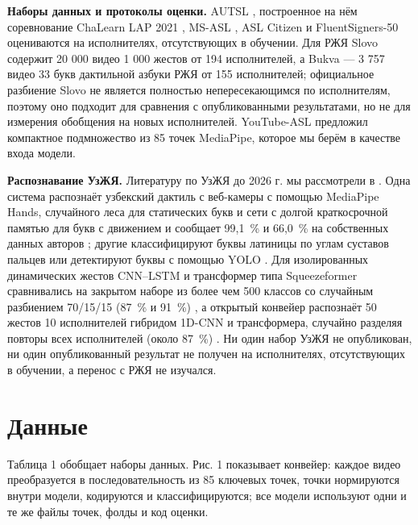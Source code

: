 \documentclass[a4paper,fleqn]{cas-dc}
\begin{document}
\textbf{Наборы данных и протоколы оценки.} AUTSL \cite{2020_sincan_autsl}, построенное на нём соревнование ChaLearn LAP 2021 \cite{2021_sincan_chalearn_lap_islr}, MS-ASL \cite{2019_joze_msasl}, ASL Citizen \cite{2023_desai_asl_citizen} и FluentSigners-50 \cite{2022_mukushev_fluentsigners50} оцениваются на исполнителях, отсутствующих в обучении. Для РЖЯ Slovo \cite{2023_kapitanov_slovo} содержит 20 000 видео 1 000 жестов от 194 исполнителей, а Bukva \cite{2024_kvanchiani_bukva} --- 3 757 видео 33 букв дактильной азбуки РЖЯ от 155 исполнителей; официальное разбиение Slovo не является полностью непересекающимся по исполнителям, поэтому оно подходит для сравнения с опубликованными результатами, но не для измерения обобщения на новых исполнителей. YouTube-ASL \cite{2023_uthus_youtube_asl} предложил компактное подмножество из 85 точек MediaPipe, которое мы берём в качестве входа модели.

\textbf{Распознавание УзЖЯ.} Литературу по УзЖЯ до 2026 г. мы рассмотрели в \cite{2026_onarkulov_slr_review_uzsl}. Одна система распознаёт узбекский дактиль с веб-камеры с помощью MediaPipe Hands, случайного леса для статических букв и сети с долгой краткосрочной памятью для букв с движением и сообщает 99,1~\% и 66,0~\% на собственных данных авторов \cite{2026_jovlieva_webcam_uzbek_fingerspelling}; другие классифицируют буквы латиницы по углам суставов пальцев \cite{2024_kayumov_uzsl_latin_angular_signs} или детектируют буквы с помощью YOLO \cite{2024_akhmedov_uzsl_dactyl_yolo}. Для изолированных динамических жестов CNN--LSTM и трансформер типа Squeezeformer сравнивались на закрытом наборе из более чем 500 классов со случайным разбиением 70/15/15 (87~\% и 91~\%) \cite{2026_ergashev_cnnlstm_vs_squeezeformer_uzsl}, а открытый конвейер распознаёт 50 жестов 10 исполнителей гибридом 1D-CNN и трансформера, случайно разделяя повторы всех исполнителей (около 87~\%) \cite{2025_akkomron_uzslr_isolated_dynamic}. Ни один набор УзЖЯ не опубликован, ни один опубликованный результат не получен на исполнителях, отсутствующих в обучении, а перенос с РЖЯ не изучался.

\hypertarget{ux434ux430ux43dux43dux44bux435}{%
\section{Данные}\label{ux434ux430ux43dux43dux44bux435}}

Таблица 1 обобщает наборы данных. Рис. 1 показывает конвейер: каждое видео преобразуется в последовательность из 85 ключевых точек, точки нормируются внутри модели, кодируются и классифицируются; все модели используют одни и те же файлы точек, фолды и код оценки.
\end{document}
